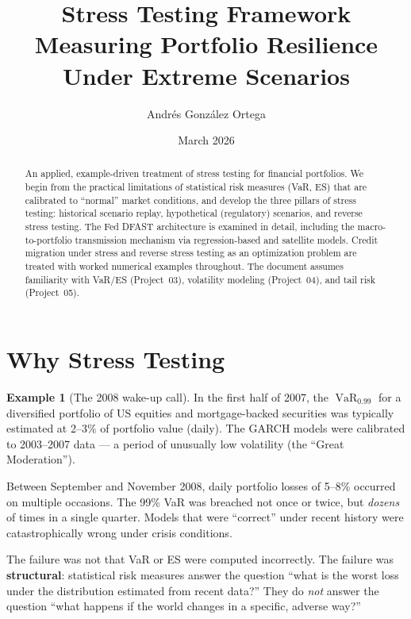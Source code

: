 \documentclass[11pt, a4paper]{article}
\title{%
    \textbf{Stress Testing Framework} \\[0.5em]
    \large Measuring Portfolio Resilience Under Extreme Scenarios
}
\author{Andr\'es Gonz\'alez Ortega}
\date{March 2026}
\theoremstyle{definition}
\newtheorem{example}{Example}[section]
\theoremstyle{plain}
\theoremstyle{remark}
\newcommand{\VaR}{\operatorname{VaR}}
\begin{document}
\maketitle

\begin{abstract}
An applied, example-driven treatment of stress testing for financial portfolios.
We begin from the practical limitations of statistical risk measures (VaR, ES)
that are calibrated to ``normal'' market conditions,
and develop the three pillars of stress testing:
historical scenario replay, hypothetical (regulatory) scenarios, and reverse stress testing.
The Fed DFAST architecture is examined in detail,
including the macro-to-portfolio transmission mechanism via regression-based and satellite models.
Credit migration under stress and reverse stress testing as an optimization problem are treated
with worked numerical examples throughout.
The document assumes familiarity with VaR/ES (Project~03), volatility modeling (Project~04),
and tail risk (Project~05).
\end{abstract}

\tableofcontents
\newpage

\section{Why Stress Testing}
\label{sec:why-stress}

\begin{example}[The 2008 wake-up call]\label{ex:2008-wakeup}
In the first half of 2007, the $\VaR_{0.99}$ for a diversified portfolio of US equities
and mortgage-backed securities was typically estimated at 2--3\% of portfolio value (daily).
The GARCH models were calibrated to 2003--2007 data --- a period of unusually low volatility
(the ``Great Moderation'').

Between September and November 2008, daily portfolio losses of 5--8\%
occurred on multiple occasions.
The 99\% VaR was breached not once or twice, but \emph{dozens} of times in a single quarter.
Models that were ``correct'' under recent history
were catastrophically wrong under crisis conditions.
\end{example}

The failure was not that VaR or ES were computed incorrectly.
The failure was \textbf{structural}: statistical risk measures answer the question
``what is the worst loss under the distribution estimated from recent data?''
They do \emph{not} answer the question
``what happens if the world changes in a specific, adverse way?''
\end{document}
